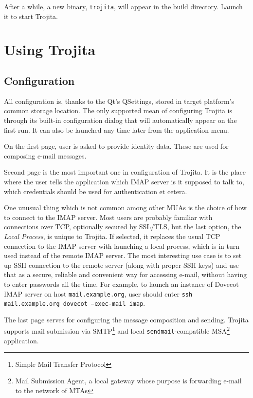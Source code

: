\documentclass[12pt,notitlepage]{report}
\newcommand{\trojita}{Trojita\xspace}
\begin{document}
After a while, a new binary, {\tt trojita}, will appear in the build directory.
Launch it to start \trojita.

\section{Using \trojita}
\subsection{Configuration}

All configuration is, thanks to the Qt's QSettings, stored in target platform's
common storage location. The only supported mean of configuring \trojita is
through its built-in configuration dialog that will automatically appear on the
first run.  It can also be launched any time later from the application menu.


On the first page, user is asked to provide identity data. These are used for
composing e-mail messages.

Second page is the most important one in configuration of \trojita. It is the
place where the user tells the application which IMAP server is it supposed to
talk to, which credentials should be used for authentication et cetera.

One unusual thing which is not common among other MUAs is the choice of how to
connect to the IMAP server.  Most users are probably familiar with connections
over TCP, optionally secured by SSL/TLS, but the last option, the {\em Local
Process}, is unique to \trojita. If selected, it replaces the usual TCP
connection to the IMAP server with launching a local process, which is in turn
used instead of the remote IMAP server. The most interesting use case is to set
up SSH connection to the remote server (along with proper SSH keys) and use that
as a secure, reliable and convenient way for accessing e-mail, without having to
enter passwords all the time. For example, to launch an instance of Dovecot IMAP
server on host {\tt mail.example.org}, user should enter {\tt ssh
mail.example.org dovecot --exec-mail imap}.

The last page serves for configuring the message composition and sending.
\trojita supports mail submission via SMTP\footnote{Simple Mail Transfer
Protocol} and local {\tt sendmail}-compatible MSA\footnote{Mail Submission
Agent\cite{rfc-msa}, a local gateway whose purpose is forwarding e-mail to the
network of MTAs} application.
\end{document}
